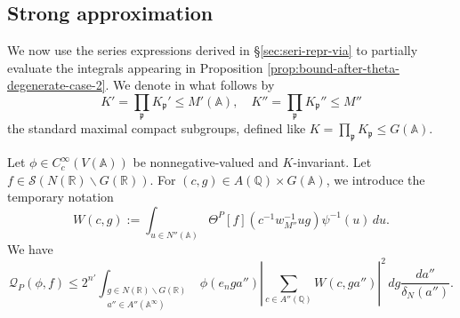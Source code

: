 \subsection{Strong approximation}\label{sec:strong-approximation}
We now use the series expressions derived in \S\ref{sec:seri-repr-via} to partially evaluate the integrals appearing in Proposition \ref{prop:bound-after-theta-degenerate-case-2}.  We denote in what follows by
\begin{equation*}
  K'  = \prod_\mathfrak{p} K_\mathfrak{p} ' \leq M'(\mathbb{A}), \quad K'' = \prod_\mathfrak{p} K_\mathfrak{p} '' \leq M''
\end{equation*}
the standard maximal compact subgroups, defined like $K =\prod_\mathfrak{p} K_\mathfrak{p} \leq G(\mathbb{A})$.
\begin{lemma}\label{lem:sub-gln:let-phi-in}
  Let $\phi \in C_c^\infty(V(\mathbb{A}))$ be nonnegative-valued and $K$-invariant.  Let $f \in \mathcal{S}(N(\mathbb{R}) \backslash G(\mathbb{R}))$.  For $(c,g) \in A(\mathbb{Q}) \times G(\mathbb{A})$, we introduce the temporary notation
  \begin{equation*}
    W(c,g) := \int_{u \in N''(\mathbb{A})} \Theta^P[f](c^{-1} w_{M''}^{-1} u g) \psi^{-1} (u) \, d u.
  \end{equation*}
  We have
  \begin{equation}\label{eq:mathc-f_infty-leq}
    \mathcal{Q}_P(\phi,f)
    \leq
    2^{n'}
    \int_{
      \substack{
        g \in N(\mathbb{R}) \backslash G(\mathbb{R}) \\
        a'' \in A''(\mathbb{A}^\infty)
      }
    }
    \phi(e_n g a'')
    \left\lvert
      \sum_{c \in A''(\mathbb{Q})}
      W(c,g a'')
    \right\rvert^2
    \, d g \frac{d a''}{\delta_N(a'')}.
  \end{equation}
\end{lemma}
